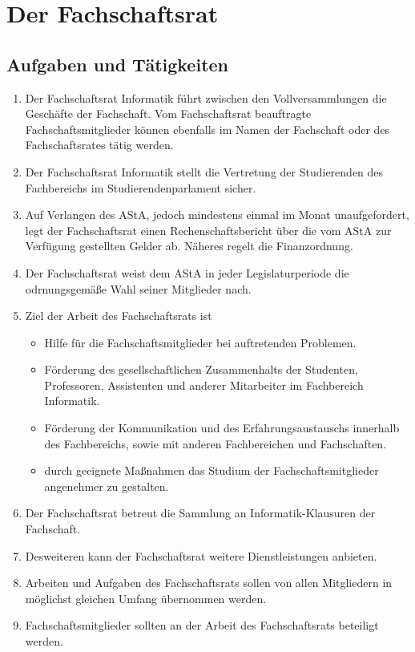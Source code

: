 \section{Der Fachschaftsrat}
\subsection{Aufgaben und Tätigkeiten}
\begin{enumerate}
\item Der Fachschaftsrat Informatik führt zwischen den Vollversammlungen die Geschäfte der Fachschaft. Vom Fachschaftsrat beauftragte Fachschaftsmitglieder können ebenfalls im Namen der Fachschaft oder des Fachschaftsrates tätig werden.
\item Der Fachschaftsrat Informatik stellt die Vertretung der Studierenden des Fachbereichs im Studierendenparlament sicher.
\item Auf Verlangen des AStA, jedoch mindestens einmal im Monat unaufgefordert, legt der Fachschaftsrat einen Rechenschaftsbericht über die vom AStA zur Verfügung gestellten Gelder ab. Näheres regelt die Finanzordnung.
\item Der Fachschaftsrat weist dem AStA in jeder Legislaturperiode die odrnungsgemäße Wahl seiner Mitglieder nach.
\item Ziel der Arbeit des Fachschaftsrats ist
\begin{itemize}
\item Hilfe für die Fachschaftsmitglieder bei auftretenden Problemen.
\item Förderung des gesellschaftlichen Zusammenhalts der Studenten, Professoren, Assistenten und anderer Mitarbeiter im Fachbereich Informatik.
\item Förderung der Kommunikation und des Erfahrungsaustauschs innerhalb des Fachbereichs, sowie mit anderen Fachbereichen und Fachschaften.
\item durch geeignete Maßnahmen das Studium der Fachschaftsmitglieder angenehmer zu gestalten.
\end{itemize}
\item Der Fachschaftsrat betreut die Sammlung an Informatik-Klausuren der Fachschaft.
\item Desweiteren kann der Fachschaftsrat weitere Dienstleistungen anbieten.
\item Arbeiten und Aufgaben des Fachschaftsrats sollen von allen Mitgliedern in möglichst gleichen Umfang übernommen werden.
\item Fachschaftsmitglieder sollten an der Arbeit des Fachschaftsrats beteiligt werden.
\end{enumerate}

